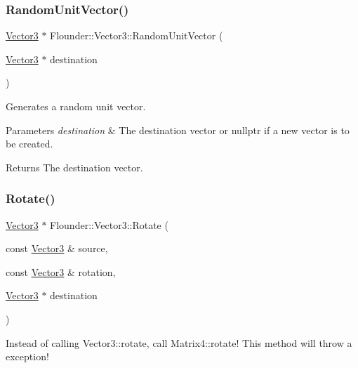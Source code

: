 \subsubsection{\texorpdfstring{Random\+Unit\+Vector()}{RandomUnitVector()}}
{\footnotesize\ttfamily \hyperlink{class_flounder_1_1_vector3}{Vector3} $\ast$ Flounder\+::\+Vector3\+::\+Random\+Unit\+Vector (\begin{DoxyParamCaption}\item[{\hyperlink{class_flounder_1_1_vector3}{Vector3} $\ast$}]{destination }\end{DoxyParamCaption})\hspace{0.3cm}{\ttfamily [static]}}



Generates a random unit vector. 


\begin{DoxyParams}{Parameters}
{\em destination} & The destination vector or nullptr if a new vector is to be created. \\
\hline
\end{DoxyParams}
\begin{DoxyReturn}{Returns}
The destination vector. 
\end{DoxyReturn}
\mbox{\label{class_flounder_1_1_vector3_a692c1fb0b50218de9f72094d4154ed09}} 
\subsubsection{\texorpdfstring{Rotate()}{Rotate()}}
{\footnotesize\ttfamily \hyperlink{class_flounder_1_1_vector3}{Vector3} $\ast$ Flounder\+::\+Vector3\+::\+Rotate (\begin{DoxyParamCaption}\item[{const \hyperlink{class_flounder_1_1_vector3}{Vector3} \&}]{source,  }\item[{const \hyperlink{class_flounder_1_1_vector3}{Vector3} \&}]{rotation,  }\item[{\hyperlink{class_flounder_1_1_vector3}{Vector3} $\ast$}]{destination }\end{DoxyParamCaption})\hspace{0.3cm}{\ttfamily [static]}}



Instead of calling Vector3\+::rotate, call Matrix4\+::rotate! This method will throw a exception! 


